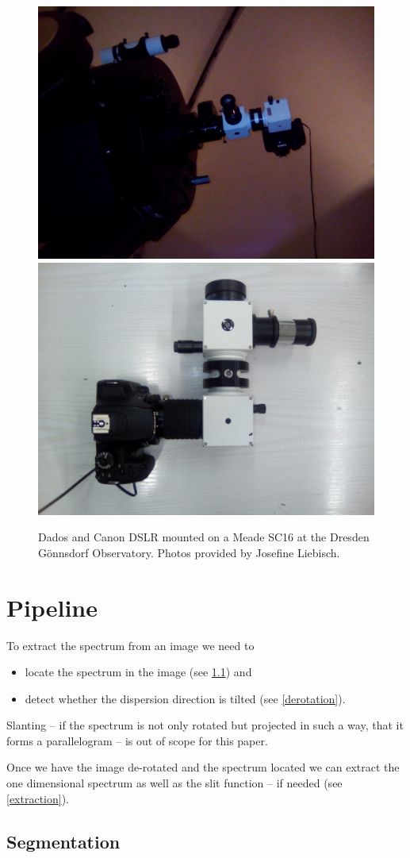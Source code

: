 \documentclass[10pt,a4paper,notitlepage]{article}
\begin{document}
	\begin{figure}[h]
	\includegraphics[width=0.49\columnwidth]{img/dados_nacht.jpg}
	\includegraphics[width=0.49\columnwidth]{img/dados_tag.jpg}
	
	\caption[orig]%
		{Dados and Canon DSLR mounted on a Meade SC16 at the Dresden Gönnsdorf Observatory. Photos provided by Josefine Liebisch.}
\end{figure}
	

\section{Pipeline}
	
	To extract the spectrum from an image we need to 
	\begin{itemize}
		\item locate the spectrum in the image (see \ref{segmentation}) and
		\item detect whether the dispersion direction is tilted (see \ref{derotation}).
	\end{itemize}

	Slanting -- if the spectrum is not only rotated but projected in such a way, that it forms a parallelogram -- is out of scope for this paper.

	Once we have the image de-rotated and the spectrum located we can extract the one dimensional spectrum as well as the slit function -- if needed (see \ref{extraction}).

	\subsection{Segmentation}
		\label{segmentation}
	
\end{document}
